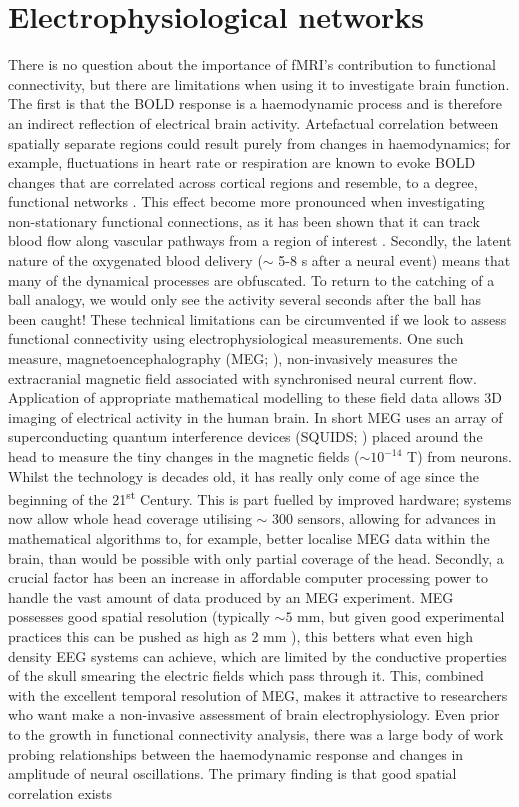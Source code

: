 \section{Electrophysiological networks}
There is no question about the importance of fMRI's contribution to functional connectivity, but there are limitations when using it to investigate brain function. The first is that the BOLD response is a haemodynamic process and is therefore an indirect reflection of electrical brain activity. Artefactual correlation between spatially separate regions could result purely from changes in haemodynamics; for example, fluctuations in heart rate or respiration are known to evoke BOLD changes that are correlated across cortical regions and resemble, to a degree, functional networks \citep{Birn2012,Murphy2013,Tong2015}. This effect become more pronounced when investigating non-stationary functional connections, as it has been shown that it can track blood flow along vascular pathways from a region of interest \citep{Webb2013}. Secondly, the latent nature of the oxygenated blood delivery ($\sim$ 5-8 s after a neural event) means that many of the dynamical processes are obfuscated. To return to the catching of a ball analogy, we would only see the activity several seconds after the ball has been caught! These technical limitations can be circumvented if we look to assess functional connectivity using electrophysiological measurements. One such measure, magnetoencephalography (MEG; \citealp{Cohen1968}), non-invasively measures the extracranial magnetic field associated with synchronised neural current flow. Application of appropriate mathematical modelling to these field data allows 3D imaging of electrical activity in the human brain. In short MEG uses an array of superconducting quantum interference devices (SQUIDS; \citealp{Zimmerman1970}) placed around the head to measure the tiny changes in the magnetic fields ($\sim10^{-14}$ T) from neurons. Whilst the technology is decades old, it has really only come of age since the beginning of the 21\textsuperscript{st} Century. This is part fuelled by improved hardware; systems now allow whole head coverage utilising $\sim$ 300 sensors, allowing for advances in mathematical algorithms to, for example, better localise MEG data within the brain, than would be possible with only partial coverage of the head. Secondly, a crucial factor has been an increase in affordable computer processing power to handle the vast amount of data produced by an MEG experiment. MEG possesses good spatial resolution (typically $\sim5$ mm, but given good experimental practices this can be pushed as high as 2 mm \citep{Troebinger2014}), this betters what even high density EEG systems can achieve, which are limited by the conductive properties of the skull smearing the electric fields which pass through it. This, combined with the excellent temporal resolution of MEG, makes it attractive to researchers who want make a non-invasive assessment of brain electrophysiology. Even prior to the growth in functional connectivity analysis, there was a large body of work probing relationships between the haemodynamic response and changes in amplitude of neural oscillations. The primary finding is that good spatial correlation exists 